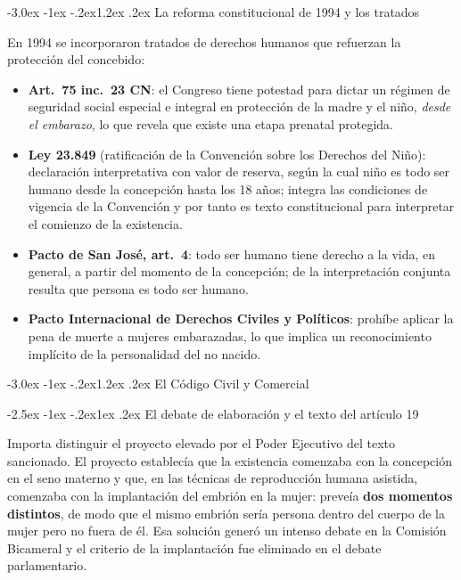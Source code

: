 \documentclass[12pt,oneside]{book}
\makeatletter
\renewcommand\section{\@startsection{section}{1}{\z@}%
  {-3.0ex \@plus -1ex \@minus -.2ex}{1.2ex \@plus .2ex}%
  {\normalfont\large\bfseries\color{acento}}}
\renewcommand\subsection{\@startsection{subsection}{2}{\z@}%
  {-2.5ex \@plus -1ex \@minus -.2ex}{1ex \@plus .2ex}%
  {\normalfont\normalsize\bfseries}}
\makeatother
\begin{document}
\section{La reforma constitucional de 1994 y los tratados}

En 1994 se incorporaron tratados de derechos humanos que refuerzan la protección del concebido:

\begin{itemize}
\item \textbf{Art.~75 inc.~23 CN}: el Congreso tiene potestad para dictar un régimen de seguridad social especial e integral en protección de la madre y el niño, \emph{desde el embarazo}, lo que revela que existe una etapa prenatal protegida.
\item \textbf{Ley 23.849} (ratificación de la Convención sobre los Derechos del Niño): declaración interpretativa con valor de reserva, según la cual niño es todo ser humano desde la concepción hasta los 18 años; integra las condiciones de vigencia de la Convención y por tanto es texto constitucional para interpretar el comienzo de la existencia.
\item \textbf{Pacto de San José, art.~4}: todo ser humano tiene derecho a la vida, en general, a partir del momento de la concepción; de la interpretación conjunta resulta que persona es todo ser humano.
\item \textbf{Pacto Internacional de Derechos Civiles y Políticos}: prohíbe aplicar la pena de muerte a mujeres embarazadas, lo que implica un reconocimiento implícito de la personalidad del no nacido.
\end{itemize}

\section{El Código Civil y Comercial}

\subsection{El debate de elaboración y el texto del artículo 19}

Importa distinguir el proyecto elevado por el Poder Ejecutivo del texto sancionado. El proyecto establecía que la existencia comenzaba con la concepción en el seno materno y que, en las técnicas de reproducción humana asistida, comenzaba con la implantación del embrión en la mujer: preveía \textbf{dos momentos distintos}, de modo que el mismo embrión sería persona dentro del cuerpo de la mujer pero no fuera de él. Esa solución generó un intenso debate en la Comisión Bicameral y el criterio de la implantación fue eliminado en el debate parlamentario.
\end{document}
